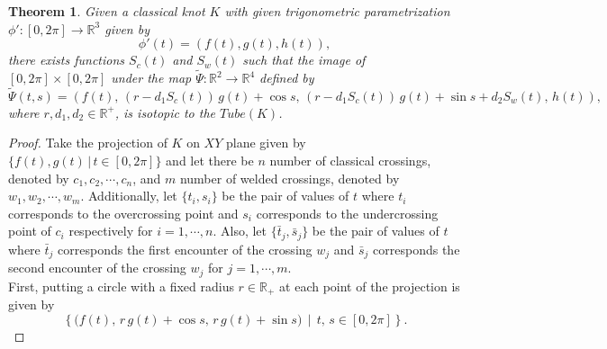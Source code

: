 \documentclass[10pt,a4paper,reqno]{amsart}
\newtheorem{theorem}{Theorem}[section]
\theoremstyle{definition}
\theoremstyle{remark}
\newcommand{\R}{\mathbb R}
\newcommand{\LP}{\left(}
\newcommand{\RP}{\right)}
\begin{document}
\begin{theorem}
	Given a classical knot $K$ with given trigonometric  parametrization $\phi': [0,2\pi] \rightarrow \R^3$ given by
	\[\phi'(t)=\LP f(t),g(t),h(t)\RP ,\]
	there exists functions $S_{c}(t)$ and $S_{w}(t)$ such that 
	the image of $[0,2\pi]\times [0,2\pi]$ under the map $\tilde{\Psi}: \R^2 \to \R^4$ defined by
	\[\tilde{\Psi}(t,s)=\LP f(t),\,(r-d_{1}S_{c}(t))\,g(t)+\cos s,\,(r-d_{1}S_{c}(t))\,g(t)+\sin s+d_{2}S_{w}(t),\, h(t)\RP,\]
	where $r, d_{1}, d_{2} \in \R^{+}$, is isotopic to the $Tube(K)$.
\end{theorem}

\begin{proof}
	Take the projection of $K$ on $XY$ plane given by 
	$\{f(t),g(t) \, \vert \, t \in[0,2\pi]\}$
	and let there be $n$ number of classical crossings, denoted by $c_{1},c_{2},\cdots,c_{n}$, and $m$ number of welded crossings, denoted by $w_{1},w_{2},\cdots,w_{m}$. Additionally, let $\{t_{i},s_{i}\}$  be the pair of values of $t$ where $t_{i}$ corresponds to the overcrossing point and $s_{i}$ corresponds to the undercrossing point of $c_{i}$ respectively for $i=1,\cdots, n$. Also, let $\{\bar{t}_{j},\bar{s}_{j}\}$  be the pair of values of $t$ where $\bar{t}_{j}$ corresponds the first encounter of the crossing $w_{j}$ and $\bar{s}_{j}$ corresponds the second encounter of the crossing $w_{j}$ for $j=1,\cdots, m$. \\
	First, putting a circle with a fixed radius $r \in \R_{+}$ at each point of the projection is given by
	\begin{equation*}
		\left\{\big(f(t),\,r \,g(t)+\cos s,\,r\, g(t)+\sin s \big)\, \middle| \, t,\,s \in[0,2\pi]\right\}.
	\end{equation*}
	

\end{proof}
\end{document}
